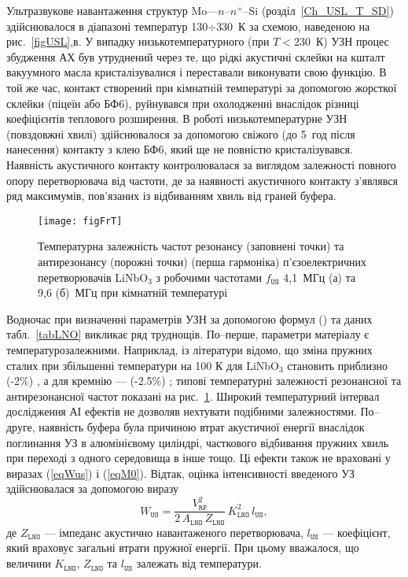 Ультразвукове навантаження структур Mo---$n$--$n^+$--Si (розділ~\ref{Ch_USL_T_SD}) здійснювалося в діапазоні температур 130$\div$330~К за схемою, наведеною на рис.~\ref{figUSL},в.
У випадку низькотемпературного (при $T<230$~К) УЗН процес збудження АХ був утруднений через те, що
рідкі акустичні склейки на кшталт вакуумного масла кристалізувалися і переставали виконувати свою функцію.
В той же час, контакт створений при кімнатній температурі за допомогою жорсткої склейки (піцеїн або БФ6),
руйнувався при охолодженні внаслідок різниці коефіцієнтів теплового розширення.
В роботі низькотемпературне УЗН (повздовжні хвилі) здійснювалося за допомогою свіжого (до 5~год після нанесення) контакту з клею БФ6,
який ще не повністю кристалізувався.
Наявність акустичного контакту контролювалася за виглядом залежності повного опору перетворювача від частоти,
де за наявності акустичного контакту з'являвся ряд максимумів, пов'язаних із відбиванням хвиль від граней буфера.

\begin{figure}
\center
\texttt{[image: figFrT]}%
\caption{\label{figFrT}
Температурна залежність частот резонансу (заповнені точки) та антирезонансу (порожні точки) (перша гармоніка)
п'єзоелектричних перетворювачів LiNbO$_3$ з робочими частотами $f_\mathtt{US}$ 4,1~МГц (а) та 9,6 (б)~МГц при кімнатній температурі
}
\end{figure}


Водночас при визначенні параметрів УЗН за допомогою формул () та даних табл.~\ref{tabLNO} викликає ряд труднощів.
По--перше, параметри матеріалу є температурозалежними.
Наприклад, із літератури відомо, що зміна пружних сталих при збільшенні температури на 100 К для LiNbO$_3$ становить приблизно (-2\%) \cite{LNO_C:Temp},
а для кремнію --- (-2.5\%) \cite{Si_C:Temp};
типові температурні залежності резонансної та антирезонансної частот показані на рис.~\ref{figFrT}.
Широкий температурний інтервал дослідження АІ ефектів не дозволяв нехтувати подібними залежностями.
По--друге, наявність буфера була причиною втрат акустичної енергії внаслідок поглинання УЗ в алюмінієвому циліндрі, часткового відбивання пружних хвиль
при переході з одного середовища в інше тощо.
Ці ефекти також не враховані у виразах (\ref{eqWus}) і  (\ref{eqM0}).
Відтак, оцінка інтенсивності введеного УЗ здійснювалася за допомогою виразу
 \begin{equation}
 \label{eqWus2}
 W_\mathtt{US}=\frac{V_\mathtt{RF}^2}{2\,A_\mathtt{LNO}\,Z_\mathtt{LNO}}\,K_\mathtt{LNO}^2\,l_\mathtt{US},
 \end{equation}
де
$Z_\mathtt{LNO}$ --- імпеданс акустично навантаженого перетворювача,
$l_\mathtt{US}$ --- коефіцієнт, який враховує загальні втрати пружної енергії.
При цьому вважалося, що величини
$K_\mathtt{LNO}$, $Z_\mathtt{LNO}$ та $l_\mathtt{US}$ залежать від температури.


